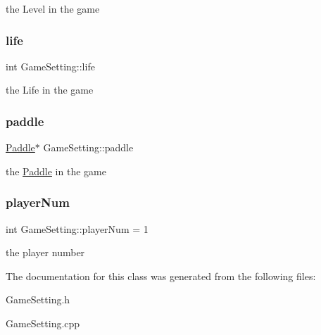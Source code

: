 the Level in the game \mbox{\label{class_game_setting_a2c124f8326919667baa7a63bd0ac671b}} 
\subsubsection{\texorpdfstring{life}{life}}
{\footnotesize\ttfamily int Game\+Setting\+::life\hspace{0.3cm}{\ttfamily [private]}}

the Life in the game \mbox{\label{class_game_setting_a2f0c76a0a83b0e800eba1db7e18abf18}} 
\subsubsection{\texorpdfstring{paddle}{paddle}}
{\footnotesize\ttfamily \mbox{\hyperlink{class_paddle}{Paddle}}$\ast$ Game\+Setting\+::paddle\hspace{0.3cm}{\ttfamily [private]}}

the \mbox{\hyperlink{class_paddle}{Paddle}} in the game \mbox{\label{class_game_setting_a6f9dbade2b2ab5139b1199642c9f6d20}} 
\subsubsection{\texorpdfstring{player\+Num}{playerNum}}
{\footnotesize\ttfamily int Game\+Setting\+::player\+Num = 1\hspace{0.3cm}{\ttfamily [private]}}

the player number 

The documentation for this class was generated from the following files\+:\begin{DoxyCompactItemize}
\item 
Game\+Setting.\+h\item 
Game\+Setting.\+cpp\end{DoxyCompactItemize}
